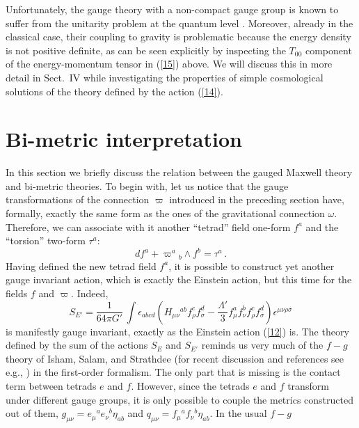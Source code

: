 \documentclass [prd,reprint,eqsecnum,nofootinbib]  {revtex4-1}
\begin{document}
Unfortunately, the gauge theory with a non-compact gauge group is
known to suffer from the unitarity problem at the quantum level
\cite{Hsu:1980zt}. Moreover, already in the classical case, their
coupling to gravity is problematic because the energy density is not
positive definite, as can be seen explicitly by inspecting the
$T_{00}$ component of the energy-momentum tensor in (\ref{15})
above. We will discuss this in more detail in Sect.\ IV while
investigating the properties of simple cosmological solutions of the
theory defined by the action (\ref{14}).

\section{Bi-metric interpretation}

In this section we briefly discuss the relation between the gauged
Maxwell theory and bi-metric theories. To begin with, let us notice
that the gauge transformations of the connection $\varpi$ introduced
in the preceding section have, formally, exactly the same form as
the ones of the gravitational connection $\omega$. Therefore, we can
associate with it another ``tetrad'' field one-form $f^a$ and the
``torsion'' two-form $\tau^a$:
\begin{equation}\label{17}
    df^a + \varpi^a{}_b\wedge f^b=\tau^a\,.
\end{equation}
Having defined the new tetrad field $f^a$, it is possible to
construct yet another gauge invariant action, which is exactly the
Einstein action, but this time for the fields $f$ and $\varpi$.
Indeed,
\begin{equation}
S_{E'} =\frac1{64\pi G'}\,
\int\epsilon_{abcd}\left(H_{\mu\nu}{}^{ab}f_{\rho}^{c}f_{\sigma}^{d}
-\frac{\Lambda'}{3}f_{\mu}^{a}f_{\nu}^{b}f_{\rho}^{ c}f_{\sigma}^{
d}\right)\epsilon^{\mu\nu\rho\sigma}\label{18}
\end{equation}
is manifestly gauge invariant, exactly as the Einstein action
(\ref{12}) is. The theory defined by the sum of the actions $S_E$
and $S_{E'}$ reminds us very much of the $f-g$ theory of Isham, Salam, and
Strathdee \cite{Isham:1971gm} (for recent discussion and references
see e.g., \cite{Banados:2008fi}) in the first-order formalism. The
only part that is missing is the contact term between tetrads $e$
and $f$. However, since the tetrads $e$ and $f$ transform under
different gauge groups, it is only possible to couple the metrics
constructed out of them, $g_{\mu\nu} = e_\mu{}^ae_\nu{}^b\eta_{ab}$
and $q_{\mu\nu} = f_\mu{}^af_\nu{}^b\eta_{ab}$. In the usual $f-g$
\end{document}
